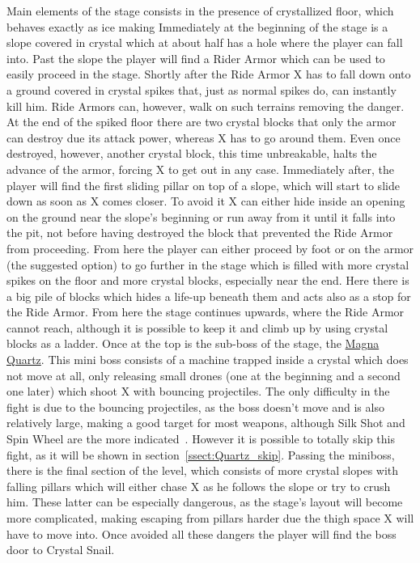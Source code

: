 Main elements of the stage consists in the presence of crystallized floor, which behaves exactly as ice making 
Immediately at the beginning of the stage is a slope covered in crystal which at about half has a hole where the player can fall into. Past the slope the player will find a Rider Armor which can be used to easily proceed in the stage. Shortly after the Ride Armor X has to fall down onto a ground covered in crystal spikes that, just as normal spikes do, can instantly kill him. Ride Armors can, however, walk on such terrains removing the danger. At the end of the spiked floor there are two crystal blocks that only the armor can destroy due its attack power, whereas X has to go around them. Even once destroyed, however, another crystal block, this time unbreakable, halts the advance of the armor, forcing X to get out in any case. Immediately after, the player will find the first sliding pillar on top of a slope, which will start to slide down as soon as X comes closer. To avoid it X can either hide inside an opening on the ground near the slope's beginning or run away from it until it falls into the pit, not before having destroyed the block that prevented the Ride Armor from proceeding. From here the player can either proceed by foot or on the armor (the suggested option) to go further in the stage which is filled with more crystal spikes on the floor and more crystal blocks, especially near the end. Here there is a big pile of blocks which hides a life-up beneath them and acts also as a stop for the Ride Armor. From here the stage continues upwards, where the Ride Armor cannot reach, although it is possible to keep it  and climb up by using crystal blocks as a ladder. Once at the top is the sub-boss of the stage, the \hyperlink{miniboss:Magna_Quartz}{Magna Quartz}. This mini boss consists of a machine trapped inside a crystal which does not move at all, only releasing small drones (one at the beginning and a second one later) which shoot X with bouncing projectiles. The only difficulty in the fight is due to the bouncing projectiles, as the boss doesn't move and is also relatively large, making a good target for most weapons, although Silk Shot and Spin Wheel are the more indicated~\cite{wiki:Magna_quartz}. However it is possible to totally skip this fight, as it will be shown in section~\ref{ssect:Quartz_skip}. Passing the miniboss, there is the final section of the level, which consists of more crystal slopes with falling pillars which will either chase X as he follows the slope or try to crush him. These latter can be especially dangerous, as the stage's layout will become more complicated, making escaping from pillars harder due the thigh space X will have to move into. Once avoided all these dangers the player will find the boss door to Crystal Snail.

